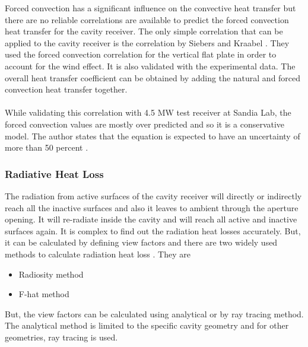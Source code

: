 Forced convection has a significant influence on the convective heat transfer but there are no reliable correlations are available to predict the forced convection heat transfer for the cavity receiver. The only simple correlation that can be applied to the cavity receiver is the correlation by Siebers and Kraabel \cite{Siebers.1984}. They used the forced convection correlation for the vertical flat plate in order to account for the wind effect. It is also validated with the experimental data. The overall heat transfer coefficient can be obtained by adding the natural and forced convection heat transfer together. \\\\
While validating this correlation with 4.5 MW test receiver at Sandia Lab, the forced convection values are mostly over predicted and so it is a conservative model. The author states that the equation is expected to have an uncertainty of more than 50 percent \cite{Siebers.1984}.
\subsubsection{Radiative Heat Loss}
The radiation from active surfaces of the cavity receiver will directly or indirectly reach all the inactive surfaces and also it leaves to ambient through the aperture opening. It will re-radiate inside the cavity and will reach all active and inactive surfaces again. It is complex to find out the radiation heat losses accurately. But, it can be calculated by defining view factors and there are two widely used methods to calculate radiation heat loss \cite{Teichel.2011}. They are
\begin{itemize}
	\item Radiosity method
	\item F-hat method
\end{itemize}
But, the view factors can be calculated using analytical or by ray tracing method. The analytical method is limited to the specific cavity geometry and for other geometries, ray tracing is used.